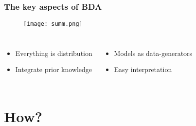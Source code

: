 \documentclass{beamer}
\begin{document}
 
 
\begin{frame}
 \frametitle{\bf The key aspects of BDA}
 
 \begin{figure}
  \texttt{[image: summ.png]}
 \end{figure}
 
 \begin{columns}
   \begin{itemize}
    \item Everything is distribution
    \item Integrate prior knowledge
   \end{itemize}
   
    \begin{itemize}
     \item Models as data-generators
     \item Easy interpretation
    \end{itemize}


 \end{columns}


 
\end{frame}

\section{How?}
\end{document}
